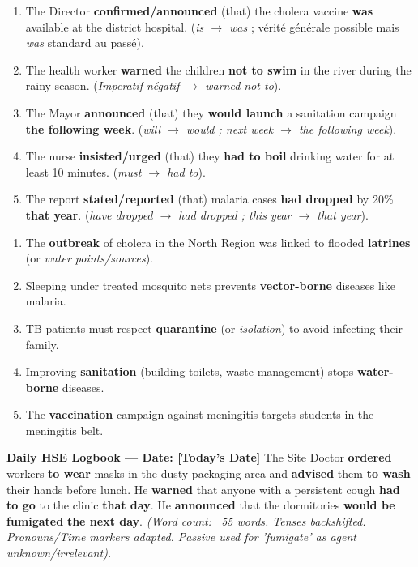 \documentclass[11pt]{article}
\newcounter{popsec}
\newcounter{popsub}
\newcommand{\courssub}[1]{%
  \stepcounter{popsub}%
  \par\vspace{9pt}\noindent{\popxbold\fontsize{11.5}{13}\selectfont\color{popink}{\color{poporange}\thepopsec.\thepopsub}\hspace{6pt}#1}\par\nopagebreak\vspace{4pt}
}
\begin{document}
\courssub{Corrigés Détaillés}

\begin{corrige}
\begin{enumerate}
    \item The Director \textbf{confirmed/announced} (that) the cholera vaccine \textbf{was} available at the district hospital. (\emph{is $\rightarrow$ was} ; vérité générale possible mais \emph{was} standard au passé).
    \item The health worker \textbf{warned} the children \textbf{not to swim} in the river during the rainy season. (\emph{Imperatif négatif $\rightarrow$ warned not to}).
    \item The Mayor \textbf{announced} (that) they \textbf{would launch} a sanitation campaign \textbf{the following week}. (\emph{will $\rightarrow$ would ; next week $\rightarrow$ the following week}).
    \item The nurse \textbf{insisted/urged} (that) they \textbf{had to boil} drinking water for at least 10 minutes. (\emph{must $\rightarrow$ had to}).
    \item The report \textbf{stated/reported} (that) malaria cases \textbf{had dropped} by 20\% \textbf{that year}. (\emph{have dropped $\rightarrow$ had dropped ; this year $\rightarrow$ that year}).
\end{enumerate}
\end{corrige}

\begin{corrige}
\begin{enumerate}
    \item The \textbf{outbreak} of cholera in the North Region was linked to flooded \textbf{latrines} (or \emph{water points/sources}).
    \item Sleeping under treated mosquito nets prevents \textbf{vector-borne} diseases like malaria.
    \item TB patients must respect \textbf{quarantine} (or \emph{isolation}) to avoid infecting their family.
    \item Improving \textbf{sanitation} (building toilets, waste management) stops \textbf{water-borne} diseases.
    \item The \textbf{vaccination} campaign against meningitis targets students in the meningitis belt.
\end{enumerate}
\end{corrige}

\begin{corrige}
\textbf{Daily HSE Logbook — Date: [Today's Date]}
The Site Doctor \textbf{ordered} workers \textbf{to wear} masks in the dusty packaging area and \textbf{advised} them \textbf{to wash} their hands before lunch. He \textbf{warned} that anyone with a persistent cough \textbf{had to go} to the clinic \textbf{that day}. He \textbf{announced} that the dormitories \textbf{would be fumigated} \textbf{the next day}.
\textit{(Word count: ~55 words. Tenses backshifted. Pronouns/Time markers adapted. Passive used for 'fumigate' as agent unknown/irrelevant).}
\end{corrige}
\end{document}
